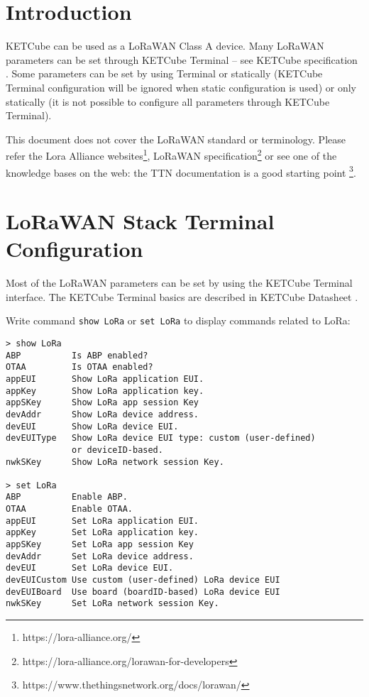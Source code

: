 \clearpage
\clearpage
\section{Introduction}
  KETCube can be used as a LoRaWAN Class A device. Many LoRaWAN parameters can be set through KETCube Terminal -- see KETCube specification \cite{ZCU:KETCube:05-2018}. Some parameters can be set by using Terminal or statically (KETCube Terminal configuration will be ignored when static configuration is used) or only statically (it is not possible to configure all parameters through KETCube Terminal).

  This document does not cover the LoRaWAN standard or terminology. Please refer the Lora Alliance websites\footnote{https://lora-alliance.org/}, LoRaWAN specification\footnote{https://lora-alliance.org/lorawan-for-developers} or see one of the knowledge bases on the web: the TTN documentation is a good starting point \footnote{https://www.thethingsnetwork.org/docs/lorawan/}.
  
\clearpage

\section{LoRaWAN Stack Terminal Configuration}
Most of the LoRaWAN parameters can be set by using the KETCube Terminal interface. The KETCube Terminal basics are described in KETCube Datasheet \cite{ZCU:KETCube:05-2018}.

Write command {\tt show LoRa} or {\tt set LoRa} to display commands related to LoRa:

\begin{Verbatim}[frame=single, fontsize=\small]
> show LoRa
ABP          Is ABP enabled?
OTAA         Is OTAA enabled?
appEUI       Show LoRa application EUI.
appKey       Show LoRa application key.
appSKey      Show LoRa app session Key
devAddr      Show LoRa device address.
devEUI       Show LoRa device EUI.
devEUIType   Show LoRa device EUI type: custom (user-defined) 
             or deviceID-based.
nwkSKey      Show LoRa network session Key.

> set LoRa
ABP          Enable ABP.
OTAA         Enable OTAA.
appEUI       Set LoRa application EUI.
appKey       Set LoRa application key.
appSKey      Set LoRa app session Key
devAddr      Set LoRa device address.
devEUI       Set LoRa device EUI.
devEUICustom Use custom (user-defined) LoRa device EUI
devEUIBoard  Use board (boardID-based) LoRa device EUI
nwkSKey      Set LoRa network session Key.
\end{Verbatim}

